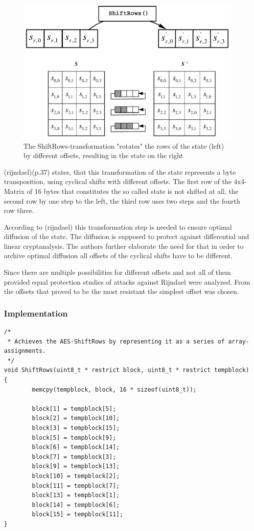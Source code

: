 \begin{figure}
\centering
\includegraphics[scale = 0.4]{data/figures/shiftrows.png} 
\caption{The ShiftRows-transformation "rotates" the rows of the state (left) by different offsets, resulting in the state on the right}
\end{figure}

(rijndael)(p.37) states, that this transformation of the state represents a byte transposition, using
cyclical shifts with different offsets. The first row of the 4x4-Matrix
of 16 bytes that constitutes the so called state is not shifted at all,
the second row by one step to the left, the third row uses two steps and
the fourth row three.

According to (rijndael) this transformation step is needed to ensure
optimal diffusion of the state. The diffusion is supposed to protect
against differential and linear cryptanalysis. The authors further
elaborate the need for that in order to archive optimal diffusion all
offsets of the cyclical shifts have to be different.

Since there are multiple possibilities for different offsets and not all
of them provided equal protection studies of attacks against Rijndael
were analyzed. From the offsets that proved to be the most resistant the
simplest offset was chosen.

\hypertarget{implementation-3}{%
\subsubsection{Implementation}\label{implementation-3}}

\begin{lstlisting}
/*
 * Achieves the AES-ShiftRows by representing it as a series of array-assignments.
 */
void ShiftRows(uint8_t * restrict block, uint8_t * restrict tempblock)
{
        memcpy(tempblock, block, 16 * sizeof(uint8_t));

        block[1] = tempblock[5];
        block[2] = tempblock[10];
        block[3] = tempblock[15];
        block[5] = tempblock[9];
        block[6] = tempblock[14];
        block[7] = tempblock[3];
        block[9] = tempblock[13];
        block[10] = tempblock[2];
        block[11] = tempblock[7];
        block[13] = tempblock[1];
        block[14] = tempblock[6];
        block[15] = tempblock[11];
}
\end{lstlisting}

